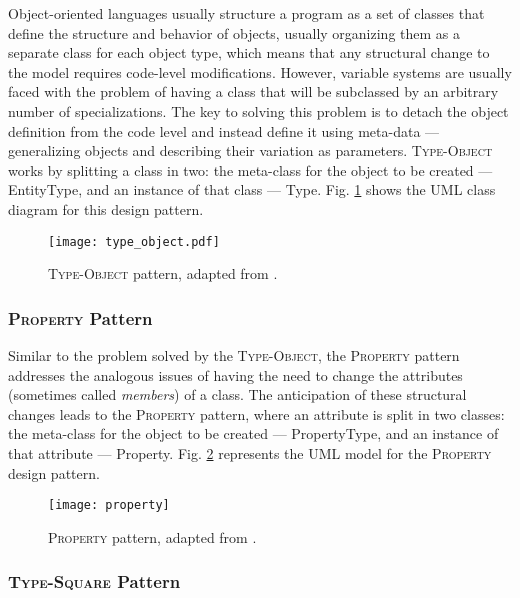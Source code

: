 Object-oriented languages usually structure a program as a set of classes that define the structure and behavior of objects, usually organizing them as a separate class for each object type, which means that any structural change to the model requires code-level modifications. However, variable systems are usually faced with the problem of having a class that will be subclassed by an arbitrary number of specializations. The key to solving this problem is to detach the object definition from the code level and instead define it using meta-data --- generalizing objects and describing their variation as parameters. \textsc{Type-Object} works by splitting a class in two\cite{YBJ01}: the meta-class for the object to be created --- EntityType, and an instance of that class --- Type. Fig. \ref{fig:type-object_pattern} shows the UML class diagram for this design pattern.

\begin{figure}[H]
  \centering
  \texttt{[image: type\_object.pdf]}
  \caption{\textsc{Type-Object} pattern, adapted from \cite{metadata_and_active_object_models}.}
  \label{fig:type-object_pattern}
\end{figure}

\subsubsection{\textsc{Property} Pattern}\label{sec:property_pattern}

Similar to the problem solved by the \textsc{Type-Object}, the \textsc{Property} pattern addresses the analogous issues of having the need to change the attributes (sometimes called \emph{members}) of a class. The anticipation of these structural changes leads to the \textsc{Property} pattern, where an attribute is split in two classes: the meta-class for the object to be created --- PropertyType, and an instance of that attribute --- Property. Fig. \ref{fig:property_pattern} represents the UML model for the \textsc{Property} design pattern.

\begin{figure}[H]
  \centering
  \texttt{[image: property]}
  \caption{\textsc{Property} pattern, adapted from \cite{metadata_and_active_object_models}.}
  \label{fig:property_pattern}
\end{figure}

\subsubsection{\textsc{Type-Square} Pattern}\label{sec:type-square_pattern}

